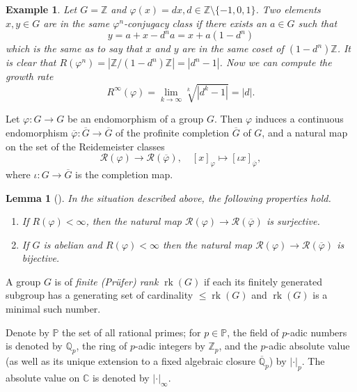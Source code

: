 \documentclass[12pt, a4paper]{amsart}
\def\Z{{\mathbb Z}}
\def\rk{\operatorname{rk}}
\newtheorem{lemma}[theorem]{Lemma}
\newtheorem{example}[theorem]{Example}
\begin{document}
\begin{example}\label{ex:compute-growth}
  Let $G = \Z$ and $\varphi(x) = dx, d \in \Z \setminus  \{-1, 0, 1\}$.
  Two elements $x, y \in G$ are in the same $\varphi^n$-conjugacy class if there exists an $a \in G$ such that
  \begin{equation*}
      y = a + x - d^na = x + a(1-d^n)
  \end{equation*}
  which is the same as to say that $x$ and $y$ are in the same coset of $(1-d^n)\Z$.
  It is clear that $R(\varphi^n) = |\Z / (1-d^n)\Z| = |d^n - 1|$.
  Now we can compute the growth rate
  \begin{equation*}
      R^{\infty}(\varphi) = \lim_{k\to\infty} \sqrt[k]{|d^k - 1|} = |d|.
  \end{equation*}
\end{example}

Let $\varphi \colon G \to G$ be an endomorphism of a group $G$.
Then $\varphi$  induces a continuous endomorphism
$\overline{\varphi} \colon \overline{G} \to \overline{G}$
of the profinite completion $\overline{G}$ of $G$, and a
natural map on the set of the Reidemeister classes
$$
\mathcal{R}(\varphi) \to
\mathcal{R}(\overline{\varphi}), \quad
[x]_{\varphi} \mapsto [ \iota x
]_{\overline{\varphi}},
$$
where $\iota: G \to  \overline{G}$ is the completion map.

\begin{lemma}[]
  \label{lem:prof-compl}
  In the situation described above, the following properties hold.
  \begin{enumerate}
  \item[(i)] If $R(\varphi) < \infty$, then the natural map
    $\mathcal{R}(\varphi) \to
    \mathcal{R}(\overline{\varphi})$ is surjective.
  \item[(ii)] If $G$ is abelian and $R(\varphi) < \infty$ then
    the natural map
    $\mathcal{R}(\varphi) \to
    \mathcal{R}(\overline{\varphi})$ is bijective.
  \end{enumerate}
\end{lemma}

A group $G$ is of \emph{finite (Pr\"ufer) rank} $\rk(G)$ if each its finitely generated subgroup has a generating set of cardinality $\le \rk(G)$ and
$\rk(G)$ is a minimal such number.

Denote by $\mathbb{P}$
the set of all rational primes; for $p \in \mathbb{P}$, the field of
$p$-adic numbers is denoted by $\mathbb{Q}_p$, the ring of $p$-adic
integers by $\mathbb{Z}_p$, and the $p$-adic absolute value (as well
as its unique extension to  a fixed  algebraic closure
$\overline{\mathbb{Q}}_p$) by $\lvert \cdot \rvert_p$.  The absolute
value on $\mathbb{C}$ is denoted by $\lvert \cdot \rvert_\infty$.
\end{document}
